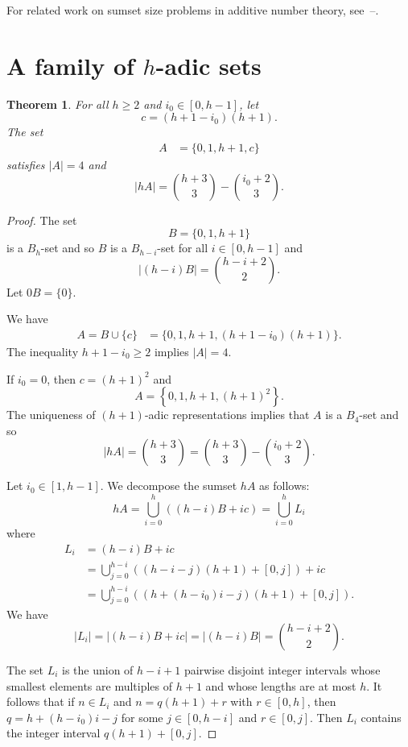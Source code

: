 \documentclass{amsart}
\newtheorem{theorem}{Theorem}
\newcommand{\bt}{\begin{theorem}}
\newcommand{\et}{\end{theorem}}
\newcommand{\beq}{\begin{equation}}
\newcommand{\eeq}{\end{equation}}
\begin{document}
 For related work on sumset size problems in additive number theory, 
 see~\cite{fox-krav-zhan25}--\cite{schi25}. 
 


\section{A family of $h$-adic sets} 
 
\bt             \label{h-adic:theorem:main} 
For all $h \geq 2$ and  $i_0 \in [0,h-1]$, let 
\[
c = (h + 1 - i_0)(h+1). 
\]
The set  
\begin{align*}
A & = \{0,1,h+1,c\} 
\end{align*}
satisfies $|A|=4$ and 
\[
|hA| = \binom{h+3}{3} - \binom{i_0+2}{3}.
\]
\et


\begin{proof}  
The set 
\[
B  = \{0,1,h+1\}  
\]
is a $B_{h}$-set  and so $B$ is a $B_{h-i}$-set for all $i \in [0,h-1]$ and 
\[
|(h-i)B| = \binom{h-i+2}{2}.
\]
Let  $0B = \{0\}$. 

We have 
\begin{align*}
A  = B \cup \{c\} & = \{0,1,h+1, (h+1-i_0)(h+1)\}.
\end{align*} 
The inequality $h+1-i_0 \geq 2$ implies $|A| = 4$.  

If $i_0 = 0$, then $c = (h+1)^2$ and 
\[
A = \left\{ 0,1,h+1, (h+1)^2\right\}. 
\]
The uniqueness of $(h+1)$-adic representations implies that 
$A$ is a $B_4$-set and so 
\[
|hA| = \binom{h+3}{3} = \binom{h+3}{3} - \binom{i_0+2}{3}.
\]

Let $i_0 \in [1,h-1]$.  
We decompose the sumset $hA$ as follows:  
\[
hA  = \bigcup_{i=0}^{h} \left( (h-i)B+ic\right)  = \bigcup_{i=0}^{h} L_i 
\]
where 
\begin{align}
L_i   & = (h-i)B+ic        \nonumber  \\ 
& = \bigcup_{j=0}^{h-i}\left(   (h-i-j)(h+1)  + [0,j] \right) + ic     \nonumber \\ 
& = \bigcup_{j=0}^{h-i} \left(  (h+ (h-i_0)i-j) (h+1) + [0,j] \right).            \label{h-adic:Li}
\end{align} 
We have 
\beq            \label{h-adic:Li-size}
|L_i | = |(h-i)B+ic| = |(h-i)B| = \binom{h-i+2}{2}. 
\eeq 

The set $L_i$ is the union of $h-i+1$ pairwise 
disjoint integer intervals whose smallest elements are multiples of $h+1$ 
and whose lengths are at most $h$.  
It follows that if $n \in L_i$ and $n = q(h+1) + r$ with $r \in [0,h]$, 
then $q = h+ (h-i_0)i-j$ for some $j \in [0,h-i]$ and $r \in [0,j]$.
Then $L_i$ contains the integer interval $q(h+1) + [0, j]$.


\end{proof}
\end{document}
